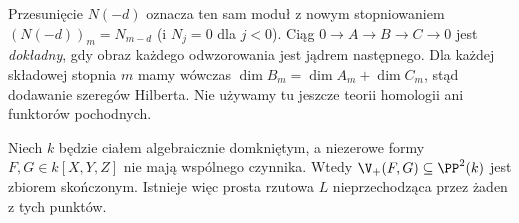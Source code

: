 \begin{uwaga}
Przesunięcie $N(-d)$ oznacza ten sam moduł z nowym
stopniowaniem $(N(-d))_m=N_{m-d}$ (i $N_j=0$ dla $j<0$).
Ciąg $0\to A\to B\to C\to0$ jest \emph{dokładny},
gdy obraz każdego odwzorowania jest jądrem następnego.
Dla każdej składowej stopnia $m$ mamy wówczas
$\dim B_m=\dim A_m+\dim C_m$, stąd dodawanie
szeregów Hilberta. Nie używamy tu jeszcze teorii
homologii ani funktorów pochodnych.
\end{uwaga}

\begin{lemat}
\label{lem:finiteness-plane-intersection}
Niech $k$ będzie ciałem algebraicznie domkniętym, a niezerowe
formy $F,G\in k[X,Y,Z]$ nie mają wspólnego czynnika.
Wtedy $\V_+(F,G)\subseteq\PP^2(k)$ jest zbiorem skończonym.
Istnieje więc prosta rzutowa $L$ nieprzechodząca przez
żaden z tych punktów.
\end{lemat}
